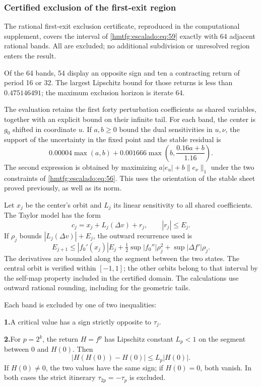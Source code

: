 \subsubsection{Certified exclusion of the first-exit region}
\label{hmtfg:escalado:16.3}

The rational first-exit exclusion certificate, reproduced in the computational supplement, covers the interval of \eqref{hmtfg:escalado:eq:59} exactly with 64 adjacent rational bands. All are excluded; no additional subdivision or unresolved region enters the result.

Of the 64 bands, 54 display an opposite sign and ten a contracting return of period 16 or 32. The largest Lipschitz bound for those returns is less than \(0.475146491\); the maximum exclusion horizon is iterate 64.

The evaluation retains the first forty perturbation coefficients as shared variables, together with an explicit bound on their infinite tail. For each band, the center is \(g_0\) shifted in coordinate \(u\). If \(a,b\ge0\) bound the dual sensitivities in \(u,\nu\), the support of the uncertainty in the fixed point and the stable residual is
\begin{equation}
0.00004\max(a,b)
+0.001666\max\left(b,\frac{0.16a+b}{1.16}\right).
\label{hmtfg:escalado:eq:61}
\end{equation}
The second expression is obtained by maximizing \(a|e_u|+b\|e_\nu\|_1\) under the two constraints of \eqref{hmtfg:escalado:eq:56}. This uses the orientation of the stable sheet proved previously, as well as its norm.

Let \(x_j\) be the center’s orbit and \(L_j\) its linear sensitivity to all shared coefficients. The Taylor model has the form
\[
c_j=x_j+L_j(\Delta v)+r_j,\qquad |r_j|\le E_j.
\]
If \(\rho_j\) bounds \(|L_j(\Delta v)|+E_j\), the outward recurrence used is
\begin{equation}
E_{j+1}\le |f_0'(x_j)|E_j
+\tfrac12\sup|f_0''|\rho_j^2
+\sup|\Delta f'|\rho_j.
\label{hmtfg:escalado:eq:62}
\end{equation}
The derivatives are bounded along the segment between the two states. The central orbit is verified within \([-1,1]\); the other orbits belong to that interval by the self-map property included in the certified domain. The calculations use outward rational rounding, including for the geometric tails.

Each band is excluded by one of two inequalities:

\par\noindent\textbf{1.}\enspace A critical value has a sign strictly opposite to \(\tau_j\).
\par\noindent\textbf{2.}\enspace For \(p=2^k\), the return \(H=f^p\) has Lipschitz constant \(L_p<1\) on the segment between \(0\) and \(H(0)\). Then
\[
|H(H(0))-H(0)|\le L_p|H(0)|.
\]
If \(H(0)\ne0\), the two values have the same sign; if \(H(0)=0\), both vanish. In both cases the strict itinerary \(\tau_{2p}=-\tau_p\) is excluded.

